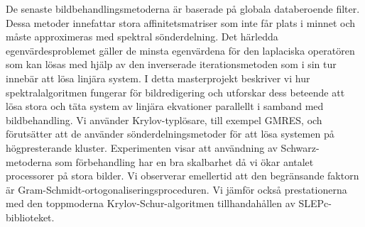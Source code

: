 De senaste bildbehandlingsmetoderna är baserade på globala databeroende filter.
Dessa metoder innefattar stora affinitetsmatriser som inte får plats i minnet och måste approximeras med spektral sönderdelning.
Det härledda egenvärdesproblemet gäller de minsta egenvärdena för den laplaciska operatören som kan lösas med hjälp av den inverserade iterationsmetoden som i sin tur innebär att lösa linjära system.
I detta masterprojekt beskriver vi hur spektralalgoritmen fungerar för bildredigering och utforskar dess beteende att lösa stora och täta system av linjära ekvationer parallellt i samband med bildbehandling.
Vi använder Krylov-typlösare, till exempel GMRES, och förutsätter att de använder sönderdelningsmetoder för att lösa systemen på högpresterande kluster.
Experimenten visar att användning av Schwarz-metoderna som förbehandling har en bra skalbarhet då vi ökar antalet processorer på stora bilder.
Vi observerar emellertid att den begränsande faktorn är Gram-Schmidt-ortogonaliseringsproceduren.
Vi jämför också prestationerna med den toppmoderna Krylov-Schur-algoritmen tillhandahållen av SLEPc-biblioteket.
